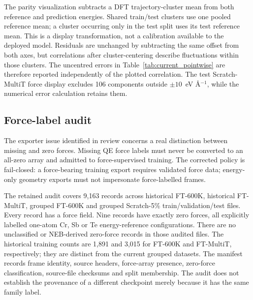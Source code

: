 \documentclass[pdflatex,sn-mathphys-num]{sn-jnl}
\newcommand{\file}[1]{\texttt{\detokenize{#1}}}
\begin{document}
\begin{table}[htbp]
\centering\small
\caption{\textbf{Current uncentred held-out errors.} Energy RMSE in meV atom$^{-1}$ and Cartesian force-component RMSE in meV \AA$^{-1}$, reported as means and sample standard deviations over training seeds 123, 234 and 345. The underlying 24 train/test evaluations are retained in the current-release source table. Temperature conditions have different test compositions, so this is not a common-test comparison between 600~K and MultiT.}
\label{tab:current_pointwise}

\end{table}

The parity visualization subtracts a DFT trajectory-cluster mean from both reference and prediction energies. Shared train/test clusters use one pooled reference mean; a cluster occurring only in the test split uses its test reference mean. This is a display transformation, not a calibration available to the deployed model. Residuals are unchanged by subtracting the same offset from both axes, but correlations after cluster-centering describe fluctuations within those clusters. The uncentred errors in Table~\ref{tab:current_pointwise} are therefore reported independently of the plotted correlation. The test Scratch-MultiT force display excludes 106 components outside $\pm10$~eV \AA$^{-1}$, while the numerical error calculation retains them.

\subsection{Force-label audit}\label{sec:force_audit}
The exporter issue identified in review concerns a real distinction between missing and zero forces. Missing QE force labels must never be converted to an all-zero array and admitted to force-supervised training. The corrected policy is fail-closed: a force-bearing training export requires validated force data; energy-only geometry exports must not impersonate force-labelled frames.

The retained audit covers 9,163 records across historical FT-600K, historical FT-MultiT, grouped FT-600K and grouped Scratch-5\% train/validation/test files. Every record has a force field. Nine records have exactly zero forces, all explicitly labelled one-atom Cr, Sb or Te \file{IsolatedAtom} energy-reference configurations. There are no unclassified or NEB-derived zero-force records in those audited files. The historical training counts are 1,891 and 3,015 for FT-600K and FT-MultiT, respectively; they are distinct from the current grouped datasets. The manifest records frame identity, source headers, force-array presence, zero-force classification, source-file checksums and split membership. The audit does not establish the provenance of a different checkpoint merely because it has the same family label.
\end{document}
